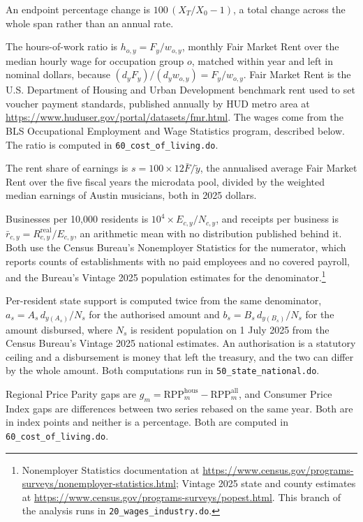 An endpoint percentage change is \(100\,(X_T/X_0 - 1)\), a total change
across the whole span rather than an annual rate.

The hours-of-work ratio is \(h_{o,y} = F_y / w_{o,y}\), monthly Fair Market
Rent over the median hourly wage for occupation group \(o\), matched within
year and left in nominal dollars, because
\((d_y F_y)/(d_y w_{o,y}) = F_y / w_{o,y}\). Fair Market Rent is the U.S.
Department of Housing and Urban Development benchmark rent used to set
voucher payment standards, published annually by HUD metro area at
\url{https://www.huduser.gov/portal/datasets/fmr.html}. The wages come from
the BLS Occupational Employment and Wage Statistics program, described
below. The ratio is computed in \texttt{60\_cost\_of\_living.do}.

The rent share of earnings is \(s = 100 \times 12\bar{F}/\tilde{y}\), the
annualised average Fair Market Rent over the five fiscal years the microdata
pool, divided by the weighted median earnings of Austin musicians, both in
2025 dollars.

Businesses per 10,000 residents is \(10^{4} \times E_{c,y}/N_{c,y}\), and
receipts per business is \(\bar{r}_{c,y} = R^{\mathrm{real}}_{c,y}/E_{c,y}\),
an arithmetic mean with no distribution published behind it. Both use the
Census Bureau's Nonemployer Statistics for the numerator, which reports
counts of establishments with no paid employees and no covered payroll, and
the Bureau's Vintage 2025 population estimates for the
denominator.\footnote{Nonemployer Statistics documentation at
\url{https://www.census.gov/programs-surveys/nonemployer-statistics.html};
Vintage 2025 state and county estimates at
\url{https://www.census.gov/programs-surveys/popest.html}. This branch of
the analysis runs in \texttt{20\_wages\_industry.do}.}

Per-resident state support is computed twice from the same denominator,
\(a_s = A_s\,d_{y(A_s)}/N_s\) for the authorised amount and
\(b_s = B_s\,d_{y(B_s)}/N_s\) for the amount disbursed, where \(N_s\) is
resident population on 1 July 2025 from the Census Bureau's Vintage 2025
national estimates. An authorisation is a statutory ceiling and a
disbursement is money that left the treasury, and the two can differ by the
whole amount. Both computations run in \texttt{50\_state\_national.do}.

Regional Price Parity gaps are
\(g_m = \mathrm{RPP}^{\mathrm{hous}}_m - \mathrm{RPP}^{\mathrm{all}}_m\),
and Consumer Price Index gaps are differences between two series rebased on
the same year. Both are in index points and neither is a percentage. Both
are computed in \texttt{60\_cost\_of\_living.do}.

